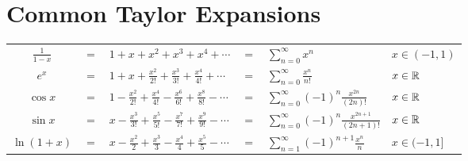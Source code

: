 \section{Common Taylor Expansions}

\begin{center} 
   \begin{tabular}{clllll}
    \hline
    $\displaystyle \frac{1}{1-x}$ & $ = $ & $1 + x + x^2 + x^3 + x^4 + \cdots$ & $=$ & $\displaystyle \sum_{n=0}^\infty x^n$ & $x \in (-1,1)$ \\
    $e^x$ & $=$ & $\displaystyle 1 + x + \frac{x^2}{2!} + \frac{x^3}{3!} + \frac{x^4}{4!} + \cdots$ & $=$ & $\displaystyle \sum_{n=0}^\infty \frac{x^n}{n!}$ & $x \in \mathbb{R}$ \\
    $\cos x$ & $=$ & $\displaystyle 1 - \frac{x^2}{2!} + \frac{x^4}{4!} - \frac{x^6}{6!} + \frac{x^8}{8!} - \cdots$ & $=$ & $\displaystyle \sum_{n=0}^\infty (-1)^n \frac{x^{2n}}{(2n)!}$ & $x \in \mathbb{R}$ \\
    $\sin x$ & $=$ & $\displaystyle x - \frac{x^3}{3!} + \frac{x^5}{5!} - \frac{x^7}{7!} + \frac{x^9}{9!} - \cdots$ & $=$ & $\displaystyle \sum_{n=0}^\infty (-1)^n \frac{x^{2n+1}}{(2n+1)!}$ & $x \in \mathbb{R}$ \\
    $\ln (1+x)$ & $=$ & $\displaystyle x - \frac{x^2}{2} + \frac{x^3}{3} - \frac{x^4}{4} + \frac{x^5}{5} - \cdots$ & $=$ & $\displaystyle \sum_{n=1}^\infty (-1)^{n+1} \frac{x^n}{n}$ & $x \in (-1, 1]$ \\
    \hline
\end{tabular} 
\end{center}

